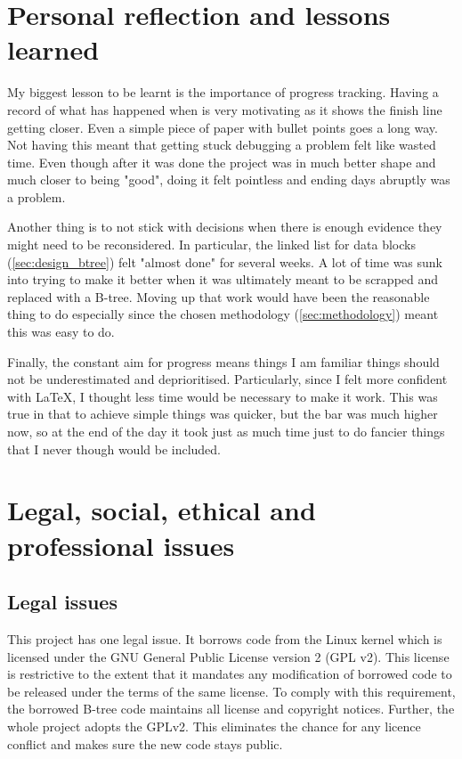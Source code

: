 \begin{appendices}
    \section{Personal reflection and lessons learned}

        My biggest lesson to be learnt is the importance of progress tracking.
        Having a record of what has happened when is very motivating as it
        shows the finish line getting closer. Even a simple piece of paper with
        bullet points goes a long way. Not having this meant that getting stuck
        debugging a problem felt like wasted time. Even though after it was
        done the project was in much better shape and much closer to being
        "good", doing it felt pointless and ending days abruptly was a
        problem.

        Another thing is to not stick with decisions when there is enough
        evidence they might need to be reconsidered. In particular, the linked
        list for data blocks (\autoref{sec:design_btree}) felt "almost done"
        for several weeks. A lot of time was sunk into trying to make it better
        when it was ultimately meant to be scrapped and replaced with a B-tree.
        Moving up that work would have been the reasonable thing to do
        especially since the chosen methodology (\autoref{sec:methodology})
        meant this was easy to do.

        Finally, the constant aim for progress means things I am familiar
        things should not be underestimated and deprioritised. Particularly,
        since I felt more confident with \LaTeX{}, I thought less time would be
        necessary to make it work. This was true in that to achieve simple
        things was quicker, but the bar was much higher now, so at the end of
        the day it took just as much time just to do fancier things that I
        never though would be included.

    \section{Legal, social, ethical and professional issues}

        \subsection{Legal issues}
            \label{app:licence}

            This project has one legal issue. It borrows code from the Linux
            kernel which is licensed under the GNU General Public License
            version 2 (GPL v2). This license is restrictive to the extent that
            it mandates any modification of borrowed code to be released under
            the terms of the same license. To comply with this requirement, the
            borrowed B-tree code maintains all license and copyright notices.
            Further, the whole project adopts the GPLv2. This eliminates the
            chance for any licence conflict and makes sure the new code stays
            public.


\end{appendices}
